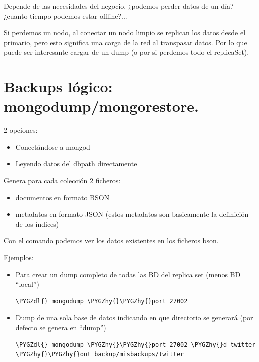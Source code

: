 \documentclass[a4paper,10pt,english]{sphinxmanual}
\def\PYGZdl{\char`\$}
\def\PYGZhy{\char`\-}
\begin{document}
Depende de las necesidades del negocio, ¿podemos perder datos de un día? ¿cuanto tiempo podemos estar offline?...

Si perdemos un nodo, al conectar un nodo limpio se replican los datos desde el primario, pero esto significa una carga de la red al transpasar datos. Por lo que puede ser interesante cargar de un dump (o por si perdemos todo el replicaSet).


\section{Backups lógico: mongodump/mongorestore.}
\label{contents/backups:backups-logico-mongodump-mongorestore}
2 opciones:
\begin{itemize}
\item {} 
Conectándose a mongod

\item {} 
Leyendo datos del dbpath directamente

\end{itemize}

Genera para cada colección 2 ficheros:
\begin{itemize}
\item {} 
documentos en formato BSON

\item {} 
metadatos en formato JSON (estos metadatos son basicamente la definición de los índices)

\end{itemize}

Con el comando  podemos ver los datos existentes en los ficheros bson.

Ejemplos:
\begin{itemize}
\item {} 
Para crear un dump completo de todas las BD del replica set (menos BD ``local'')

\begin{Verbatim}[commandchars=\\\{\}]
\PYGZdl{} mongodump \PYGZhy{}\PYGZhy{}port 27002
\end{Verbatim}

\item {} 
Dump de una sola base de datos indicando en que directorio se generará (por defecto se genera en ``dump'')

\begin{Verbatim}[commandchars=\\\{\}]
\PYGZdl{} mongodump \PYGZhy{}\PYGZhy{}port 27002 \PYGZhy{}d twitter \PYGZhy{}\PYGZhy{}out backup/misbackups/twitter
\end{Verbatim}

\end{itemize}
\end{document}

